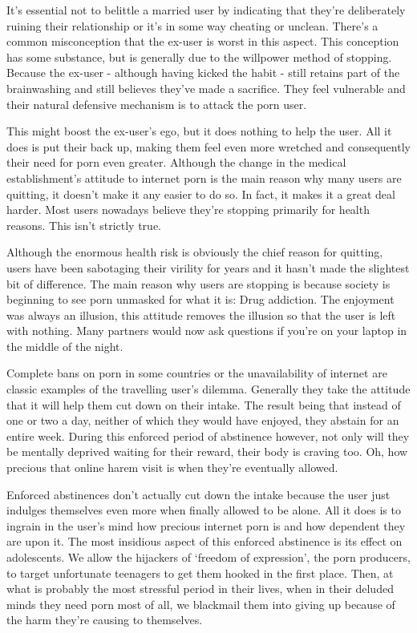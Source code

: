 \documentclass[
]{book}
\begin{document}
It's essential not to belittle a married user by indicating that they're deliberately ruining their relationship or it's in some way cheating or unclean. There's a common misconception that the ex-user is worst in this aspect. This conception has some substance, but is generally due to the willpower method of stopping. Because the ex-user - although having kicked the habit - still retains part of the brainwashing and still believes they've made a sacrifice. They feel vulnerable and their natural defensive mechanism is to attack the porn user.

This might boost the ex-user's ego, but it does nothing to help the user. All it does is put their back up, making them feel even more wretched and consequently their need for porn even greater. Although the change in the medical establishment's attitude to internet porn is the main reason why many users are quitting, it doesn't make it any easier to do so. In fact, it makes it a great deal harder. Most users nowadays believe they're stopping primarily for health reasons. This isn't strictly true.

Although the enormous health risk is obviously the chief reason for quitting, users have been sabotaging their virility for years and it hasn't made the slightest bit of difference. The main reason why users are stopping is because society is beginning to see porn unmasked for what it is: Drug addiction. The enjoyment was always an illusion, this attitude removes the illusion so that the user is left with nothing. Many partners would now ask questions if you're on your laptop in the middle of the night.

Complete bans on porn in some countries or the unavailability of internet are classic examples of the travelling user's dilemma. Generally they take the attitude that it will help them cut down on their intake. The result being that instead of one or two a day, neither of which they would have enjoyed, they abstain for an entire week. During this enforced period of abstinence however, not only will they be mentally deprived waiting for their reward, their body is craving too. Oh, how precious that online harem visit is when they're eventually allowed.

Enforced abstinences don't actually cut down the intake because the user just indulges themselves even more when finally allowed to be alone. All it does is to ingrain in the user's mind how precious internet porn is and how dependent they are upon it. The most insidious aspect of this enforced abstinence is its effect on adolescents. We allow the hijackers of `freedom of expression', the porn producers, to target unfortunate teenagers to get them hooked in the first place. Then, at what is probably the most stressful period in their lives, when in their deluded minds they need porn most of all, we blackmail them into giving up because of the harm they're causing to themselves.
\end{document}
